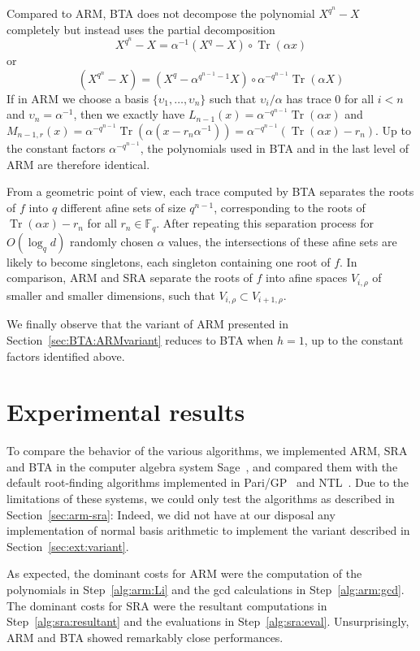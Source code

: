 \documentclass{sig-alternate}
\newcommand{\ff}[1]{\mathbb{F}_{#1}}
\newcommand{\fq}{\ff{q}}
\newcommand{\dd}{d}
\newcommand{\qq}{q}
\newcommand{\nn}{n}
\DeclareMathOperator{\Tr}{Tr}
\newcounter{algo}
\begin{document}
Compared to ARM, BTA does not decompose the polynomial $X^{\qq^\nn}-X$ completely but instead uses the partial decomposition
$$X^{\qq^\nn}-X=\alpha^{-1}(X^\qq- X)\circ\Tr(\alpha x)$$
or
$$(X^{q^n}-X) = (X^q- \alpha^{q^{n-1}-1} X)  \circ \alpha^{-q^{n-1}}\Tr(\alpha X)$$
If in ARM we choose a basis $\{\upsilon_1,\ldots,\upsilon_{\nn}\}$ such that $\upsilon_i/\alpha$ has trace 0 for all $i<\nn$ and $\upsilon_\nn=\alpha^{-1}$, then we exactly have $L_{\nn-1}(x)=\alpha^{-q^{n-1}}\Tr(\alpha x)$ and $M_{\nn-1,r}(x)=\alpha^{-q^{n-1}}\Tr(\alpha (x-r_\nn\alpha^{-1}))=\alpha^{-q^{n-1}}\left(\Tr(\alpha x)-r_\nn\right)$. Up to the constant factors $\alpha^{-q^{n-1}}$, the polynomials used in BTA and in the last level of ARM are therefore identical.

From a geometric point of view, each trace computed by BTA separates the roots of $f$ into $q$ different afine sets of size $\qq^{\nn-1}$, corresponding to the roots of $\Tr(\alpha x)-r_\nn$ for all $r_\nn\in\fq$. After repeating this separation process for $O(\log_\qq\dd)$  randomly chosen $\alpha$ values, the intersections of these afine sets are likely to become singletons, each singleton containing one root of $f$. 
%
In comparison, ARM and SRA separate the roots of $f$ into afine spaces $V_{i,\rho}$ of smaller and smaller dimensions, such that $V_{i,\rho}\subset V_{i+1,\rho}$. 

We finally observe that the variant of ARM presented in Section~\ref{sec:BTA:ARMvariant} reduces to BTA when $h=1$, up to the constant factors identified above.




\section{Experimental results}

To compare the behavior of the various algorithms, we implemented ARM,
SRA and BTA in the computer algebra system Sage~\cite{Sage}, and
compared them with the default root-finding algorithms implemented in
Pari/GP~\cite{Pari} and NTL~\cite{ntl}. Due to the limitations of
these systems, we could only test the algorithms as described in
Section~\ref{sec:arm-sra}: Indeed, we did not have at our disposal any
implementation of normal basis arithmetic to implement the variant
described in Section~\ref{sec:ext:variant}.

As expected, the dominant costs for ARM were the computation of the
polynomials in Step~\ref{alg:arm:Li} and the gcd calculations in
Step~\ref{alg:arm:gcd}. The dominant costs for SRA were the resultant
computations in Step~\ref{alg:sra:resultant} and the evaluations in
Step~\ref{alg:sra:eval}. Unsurprisingly, ARM and BTA showed remarkably
close performances.
\end{document}
